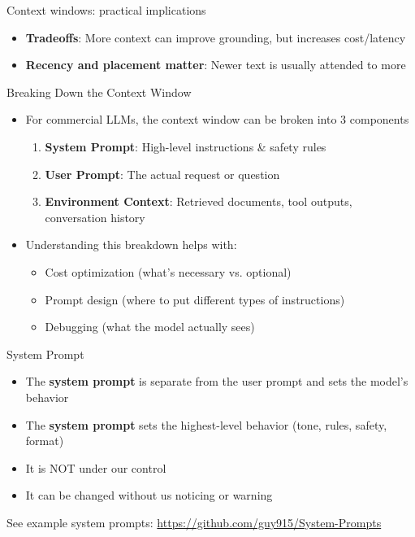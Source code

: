 \documentclass[aspectratio=169]{beamer}
\begin{document}
\begin{frame}{Context windows: practical implications}
\begin{itemize}
    \item \textbf{Tradeoffs}: More context can improve grounding, but increases cost/latency
    \item \textbf{Recency and placement matter}: Newer text is usually attended to more
    \end{itemize}
\end{frame}



\begin{frame}{Breaking Down the Context Window}
\begin{itemize}
    \item For commercial LLMs, the context window can be broken into 3 components
    \begin{enumerate}
        \item \textbf{System Prompt}: High-level instructions \& safety rules
        \item \textbf{User Prompt}: The actual request or question
        \item \textbf{Environment Context}: Retrieved documents, tool outputs, conversation history
    \end{enumerate}
        \item Understanding this breakdown helps with:
    \begin{itemize}
        \item Cost optimization (what's necessary vs. optional)
        \item Prompt design (where to put different types of instructions)
        \item Debugging (what the model actually sees)
    \end{itemize}

\end{itemize}


\end{frame}


\begin{frame}{System Prompt}
\begin{itemize}
	\item The \textbf{system prompt} is separate from the user prompt and sets the model's behavior
    \item The \textbf{system prompt} sets the highest-level behavior (tone, rules, safety, format)    
	\item It is NOT under our control
	\item It can be changed without us noticing or warning
\end{itemize}
\vspace{0.2cm}
\footnotesize See example system prompts: \url{https://github.com/guy915/System-Prompts}

\end{frame}
\end{document}
